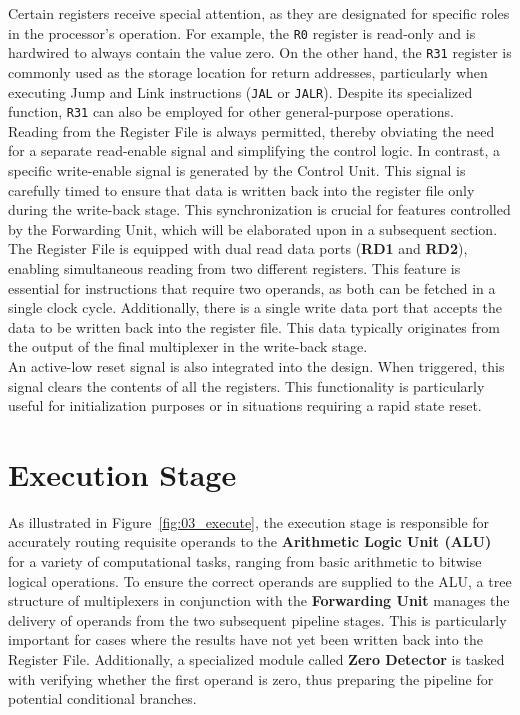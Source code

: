 Certain registers receive special attention, as they are designated for specific roles in the processor's operation. For example, the \texttt{R0} register is read-only and is hardwired to always contain the value zero. On the other hand, the \texttt{R31} register is commonly used as the storage location for return addresses, particularly when executing Jump and Link instructions (\texttt{JAL} or \texttt{JALR}). Despite its specialized function, \texttt{R31} can also be employed for other general-purpose operations. \\

Reading from the Register File is always permitted, thereby obviating the need for a separate read-enable signal and simplifying the control logic. In contrast, a specific write-enable signal is generated by the Control Unit. This signal is carefully timed to ensure that data is written back into the register file only during the write-back stage. This synchronization is crucial for features controlled by the Forwarding Unit, which will be elaborated upon in a subsequent section. \\

The Register File is equipped with dual read data ports (\textbf{RD1} and \textbf{RD2}), enabling simultaneous reading from two different registers. This feature is essential for instructions that require two operands, as both can be fetched in a single clock cycle. Additionally, there is a single write data port that accepts the data to be written back into the register file. This data typically originates from the output of the final multiplexer in the write-back stage. \\

An active-low reset signal is also integrated into the design. When triggered, this signal clears the contents of all the registers. This functionality is particularly useful for initialization purposes or in situations requiring a rapid state reset.


\newpage
\section{Execution Stage}
As illustrated in Figure~\ref{fig:03_execute}, the execution stage is responsible for accurately routing requisite operands to the \textbf{Arithmetic Logic Unit (ALU)} for a variety of computational tasks, ranging from basic arithmetic to bitwise logical operations. To ensure the correct operands are supplied to the ALU, a tree structure of multiplexers in conjunction with the \textbf{Forwarding Unit} manages the delivery of operands from the two subsequent pipeline stages. This is particularly important for cases where the results have not yet been written back into the Register File. Additionally, a specialized module called \textbf{Zero Detector} is tasked with verifying whether the first operand is zero, thus preparing the pipeline for potential conditional branches.

